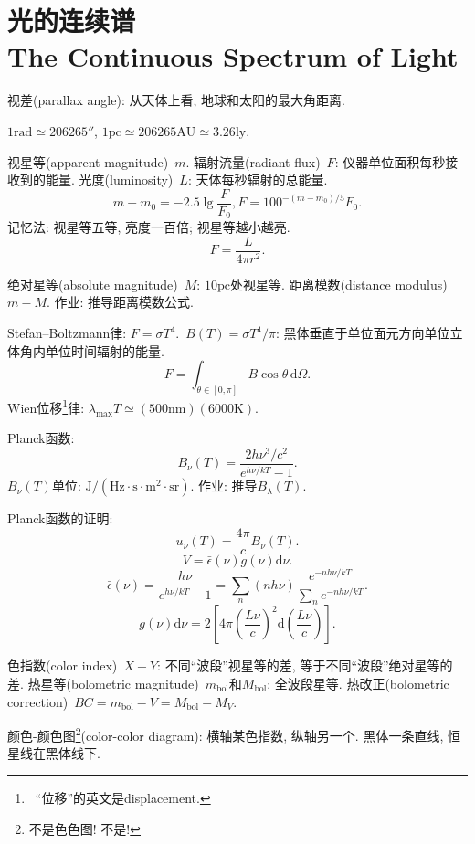 \chapter{光的连续谱\\The Continuous Spectrum of Light}

视差(parallax angle): 从天体上看, 地球和太阳的最大角距离.

$1\text{rad}\simeq 206265''$, $1\text{pc}\simeq 206265\text{AU}\simeq 3.26\text{ly}$.

视星等(apparent magnitude)~$m$. 辐射流量(radiant flux)~$F$: 仪器单位面积每秒接收到的能量. 光度(luminosity)~$L$: 天体每秒辐射的总能量.
\begin{equation*}
    m-m_0 = -2.5\lg \frac{F}{F_0}, F=100^{-(m-m_0)/5}F_0.
\end{equation*}
记忆法: 视星等五等, 亮度一百倍; 视星等越小越亮.
\begin{equation*}
    F = \frac{L}{4\pi r^2}.
\end{equation*}

绝对星等(absolute magnitude)~$M$: $10\text{pc}$处视星等. 距离模数(distance modulus)~$m-M$. 作业: 推导距离模数公式.

Stefan--Boltzmann律: $F=\sigma T^4$.~$B(T)=\sigma T^4/\pi$: 黑体垂直于单位面元方向单位立体角内单位时间辐射的能量.
\begin{equation*}
    F = \int_{\theta\in[0,\pi]}B\cos\theta\,\mathrm{d}\Omega.
\end{equation*}
Wien位移\footnote{~``位移''的英文是displacement.}律: $\lambda_\text{max}T\simeq(500\text{nm})(6000\text{K})$.

Planck函数: 
\begin{equation*}
    B_\nu(T)=\frac{2h\nu^3/c^2}{e^{h\nu/kT}-1}.
\end{equation*}
$B_\nu(T)$单位: $\text{J}/(\text{Hz}\cdot\text{s}\cdot\text{m}^2\cdot\text{sr})$. 作业: 推导$B_\lambda(T)$.

Planck函数的证明:
\begin{equation*}
    u_\nu(T)=\frac{4\pi}{c}B_\nu(T).
\end{equation*}
\begin{equation*}
    [u_\nu(T)\mathrm{d}\nu]V=\bar{\epsilon}(\nu)g(\nu)\mathrm{d}\nu.
\end{equation*}
\begin{equation*}
    \bar{\epsilon}(\nu)=\frac{h\nu}{e^{h\nu/kT}-1}=\sum_n (nh\nu)\frac{e^{-nh\nu/kT}}{\sum_n e^{-nh\nu/kT}}.
\end{equation*}
\begin{equation*}
    g(\nu)\mathrm{d}\nu=2\left[4\pi\left(\frac{L\nu}{c}\right)^2\mathrm{d}\left(\frac{L\nu}{c}\right)\right].
\end{equation*}

色指数(color index)~$X-Y$: 不同``波段''视星等的差, 等于不同``波段''绝对星等的差. 热星等(bolometric magnitude)~$m_\text{bol}$和$M_\text{bol}$: 全波段星等. 热改正(bolometric correction)~$BC=m_\text{bol}-V=M_\text{bol}-M_V$.

颜色-颜色图\footnote{不是色色图! 不是!}(color-color diagram): 横轴某色指数, 纵轴另一个. 黑体一条直线, 恒星线在黑体线下.
